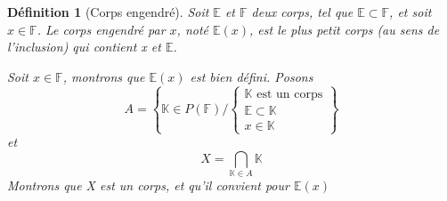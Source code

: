 \documentclass[a4paper,12pt,french]{report}
\newtheorem{definition}{Définition}[section]
\begin{document}
			\begin{definition}[Corps engendré]
				Soit \(\mathbb{E}\) et \(\mathbb{F}\) deux corps, tel que \(\mathbb{E} \subset \mathbb{F}\), et soit \(x \in \mathbb{F} \). Le corps engendré par \(x\), noté \(\mathbb{E}(x)\), est le plus petit corps (au sens de l'inclusion) qui contient x et \(\mathbb{E}\).
				
				\begin{preuve}
					Soit \(x\in \mathbb{F} \), montrons que \(\mathbb{E}(x)\) est bien défini. Posons 
					\[{}
						A = \left\{\mathbb{K} \in P(\mathbb{F}) /
						\left\{ 
						\begin{array}{lll}
							\mathbb{K} \mbox{ est un corps} \\
							\mathbb{E} \subset \mathbb{K}\\
							x \in \mathbb{K}
						\end{array}
						\right.
						\right\}
					\]
					et
					\[{}
						X = \bigcap_{\mathbb{K} \in A} \mathbb{K}
					\]
					Montrons que X est un corps, et qu'il convient pour \(\mathbb{E}(x)\){}
					

\end{preuve}
\end{definition}
\end{document}
